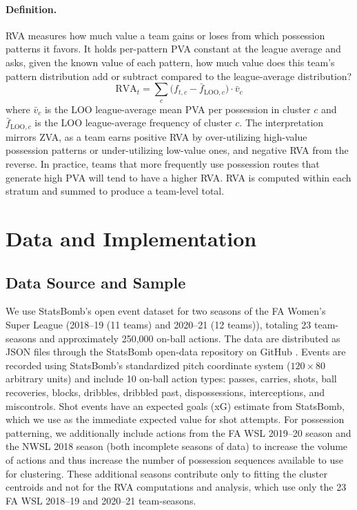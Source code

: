 \documentclass[12pt,a4paper]{article}
\begin{document}
\paragraph{Definition.}
RVA measures how much value a team gains or loses from which possession patterns it favors. It holds per-pattern PVA constant at the league average and asks, given the known value of each pattern, how much value does this team’s pattern distribution add or subtract compared to the league-average distribution?
\begin{equation}
\text{RVA}_t = \sum_{c} \bigl(f_{t,c} - \bar{f}_{\text{LOO},c}\bigr) \cdot \bar{v}_c
\end{equation}
where $\bar{v}_c$ is the LOO league-average mean PVA per possession in cluster $c$ and $\bar{f}_{\text{LOO},c}$ is the LOO league-average frequency of cluster $c$. The interpretation mirrors ZVA, as a team earns positive RVA by over-utilizing high-value possession patterns or under-utilizing low-value ones, and negative RVA from the reverse. In practice, teams that more frequently use possession routes that generate high PVA will tend to have a higher RVA. RVA is computed within each stratum and summed to produce a team-level total.

\section{Data and Implementation}

\subsection{Data Source and Sample}
We use StatsBomb’s open event dataset for two seasons of the FA Women’s Super League (2018--19 (11 teams) and 2020--21 (12 teams)), totaling 23 team-seasons and approximately 250,000 on-ball actions. The data are distributed as JSON files through the StatsBomb open-data repository on GitHub \cite{statsbomb_open_data}. Events are recorded using StatsBomb’s standardized pitch coordinate system ($120 \times 80$ arbitrary units) and include 10 on-ball action types: passes, carries, shots, ball recoveries, blocks, dribbles, dribbled past, dispossessions, interceptions, and miscontrols. Shot events have an expected goals (xG) estimate from StatsBomb, which we use as the immediate expected value for shot attempts. For possession patterning, we additionally include actions from the FA WSL 2019--20 season and the NWSL 2018 season (both incomplete seasons of data) to increase the volume of actions and thus increase the number of possession sequences available to use for clustering. These additional seasons contribute only to fitting the cluster centroids and not for the RVA computations and analysis, which use only the 23 FA WSL 2018--19 and 2020--21 team-seasons.
\end{document}
